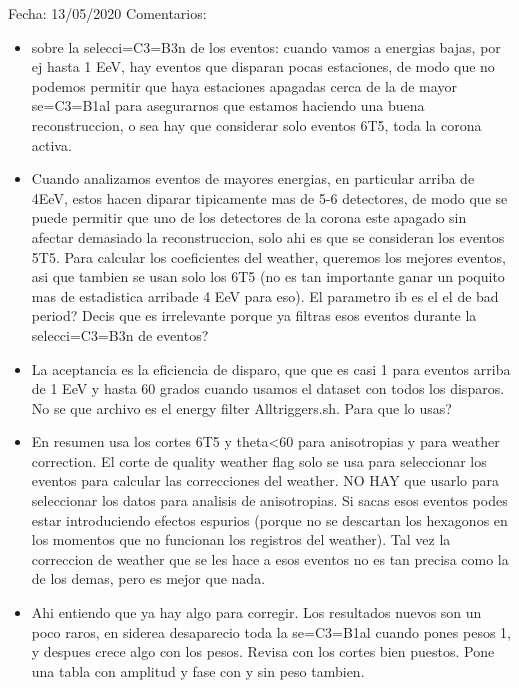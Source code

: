 Fecha: 13/05/2020
Comentarios:
\begin{itemize}
	\item sobre la selecci=C3=B3n de los eventos: cuando vamos a energias bajas, por ej hasta 1 EeV, hay eventos que disparan pocas estaciones, de modo que no podemos permitir que haya estaciones apagadas cerca de la de mayor se=C3=B1al para asegurarnos que estamos haciendo una buena reconstruccion, o sea hay que considerar solo eventos 6T5, toda la corona activa. 
\item Cuando analizamos eventos de mayores energias, en particular arriba de 4EeV, estos hacen diparar tipicamente mas de 5-6 detectores, de modo que se puede permitir que uno de
los detectores de la corona este apagado sin afectar demasiado la reconstruccion, solo ahi es que se consideran los eventos 5T5.
Para calcular los coeficientes del weather, queremos los mejores eventos, asi que tambien se usan solo los 6T5 (no es tan importante ganar un poquito mas de estadistica
arribade 4 EeV para eso). El parametro ib es el el de bad period? Decis que es irrelevante porque ya filtras esos eventos durante la selecci=C3=B3n de eventos?

\item La aceptancia es la eficiencia de disparo, que que es casi 1 para eventos arriba de 1 EeV y hasta 60 grados cuando usamos el dataset con todos los disparos. No se que archivo es el energy filter Alltriggers.sh. Para que lo usas?

\item En resumen usa los cortes 6T5 y theta<60 para anisotropias y para weather correction. El corte de quality weather flag solo se usa para seleccionar los eventos
para calcular las correcciones del weather. NO HAY que usarlo para seleccionar los datos para analisis de anisotropias. Si sacas esos eventos podes estar introduciendo efectos espurios (porque no se descartan los hexagonos en los momentos que no funcionan los registros del weather). Tal vez la correccion de weather que se les hace a esos eventos no es tan precisa como la de los demas, pero es mejor que nada.

\item Ahi entiendo que ya hay algo para corregir. Los resultados nuevos son un poco raros, en siderea desaparecio toda la se=C3=B1al cuando pones pesos 1, y despues crece algo con los pesos. Revisa con los cortes bien puestos. Pone una tabla con amplitud y fase con y sin peso tambien.
\end{itemize}
